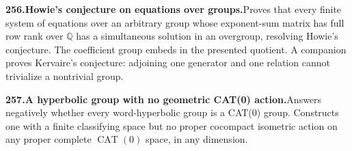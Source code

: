 \documentclass[11pt,a4paper]{article}
\begin{document}
  \par \begin{minipage}{\linewidth}
  \fontsize{10.5}{12.6}\selectfont\RaggedRight
  \hypertarget{result 256}{}
  {\bfseries\textcolor{muted}{256.}\enspace Howie's conjecture on equations over groups.}\enspace Proves that every finite system of equations over an arbitrary group whose exponent-sum matrix has full row rank over $\mathbb Q$ has a simultaneous solution in an overgroup, resolving Howie's conjecture. The coefficient group embeds in the presented quotient. A companion proves Kervaire's conjecture: adjoining one generator and one relation cannot trivialize a nontrivial group.\par
  \end{minipage}\par\vspace{5pt}



  \par \begin{minipage}{\linewidth}
  \fontsize{10.5}{12.6}\selectfont\RaggedRight
  \hypertarget{result 257}{}
  {\bfseries\textcolor{muted}{257.}\enspace A hyperbolic group with no geometric CAT(0) action.}\enspace Answers negatively whether every word-hyperbolic group is a CAT(0) group. Constructs one with a finite classifying space but no proper cocompact isometric action on any proper complete $\operatorname{CAT}(0)$ space, in any dimension.\par
  \end{minipage}\par\vspace{5pt}
\end{document}
